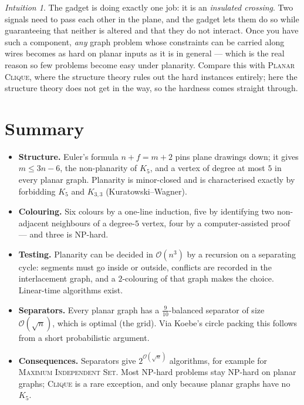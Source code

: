 \documentclass[11pt,a4paper]{article}
\theoremstyle{plain}
\theoremstyle{definition}
\theoremstyle{remark}
\newtheorem*{intuition}{Intuition}
\newcommand{\bigoh}[1]{\mathcal{O}\!\left(#1\right)}
\begin{document}
\begin{intuition}
The gadget is doing exactly one job: it is an \emph{insulated crossing}. Two
signals need to pass each other in the plane, and the gadget lets them do so
while guaranteeing that neither is altered and that they do not interact. Once
you have such a component, \emph{any} graph problem whose constraints can be
carried along wires becomes as hard on planar inputs as it is in general ---
which is the real reason so few problems become easy under planarity. Compare
this with \textsc{Planar Clique}, where the structure theory rules out the hard
instances entirely; here the structure theory does not get in the way, so the
hardness comes straight through.
\end{intuition}

\section{Summary}

\begin{itemize}
  \item \textbf{Structure.} Euler's formula $n + f = m + 2$ pins plane drawings
        down; it gives $m \le 3n-6$, the non-planarity of $K_5$, and a vertex
        of degree at most $5$ in every planar graph. Planarity is minor-closed
        and is characterised exactly by forbidding $K_5$ and $K_{3,3}$
        (Kuratowski--Wagner).
  \item \textbf{Colouring.} Six colours by a one-line induction, five by
        identifying two non-adjacent neighbours of a degree-$5$ vertex, four by
        a computer-assisted proof --- and three is NP-hard.
  \item \textbf{Testing.} Planarity can be decided in $\bigoh{n^3}$ by a
        recursion on a separating cycle: segments must go inside or outside,
        conflicts are recorded in the interlacement graph, and a $2$-colouring
        of that graph makes the choice. Linear-time algorithms exist.
  \item \textbf{Separators.} Every planar graph has a $\tfrac{9}{10}$-balanced
        separator of size $\bigoh{\sqrt n}$, which is optimal (the grid). Via
        Koebe's circle packing this follows from a short probabilistic
        argument.
  \item \textbf{Consequences.} Separators give $2^{\bigoh{\sqrt n}}$ algorithms,
        for example for \textsc{Maximum Independent Set}. Most NP-hard problems
        stay NP-hard on planar graphs; \textsc{Clique} is a rare exception, and
        only because planar graphs have no $K_5$.
\end{itemize}
\end{document}
